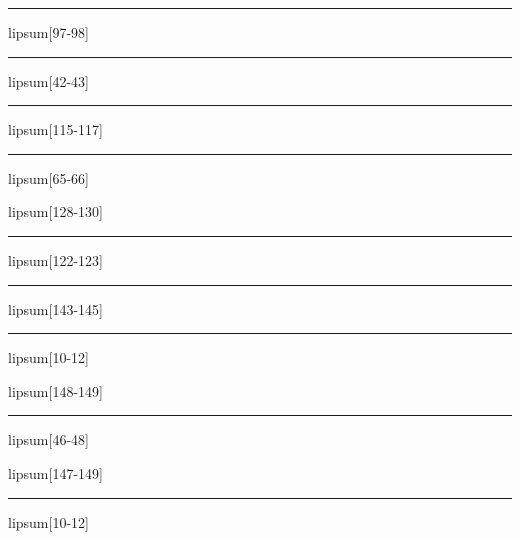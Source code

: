 \documentclass[11pt,a4paper]{article}
\begin{document}
\begin{simplewrap}
  \textcolor{pink!56}{\rule{5.4cm}{6.1cm}}
\end{simplewrap}
lipsum[97-98]

\begin{simplewrap}
  \textcolor{blue!59}{\rule{3.5cm}{4.7cm}}
\end{simplewrap}
lipsum[42-43]

\begin{simplewrap}
  \textcolor{cyan!59}{\rule{5.1cm}{5.4cm}}
\end{simplewrap}
lipsum[115-117]

\begin{simplewrap}
  \textcolor{cyan!17}{\rule{5.7cm}{9.7cm}}
\end{simplewrap}
lipsum[65-66]

lipsum[128-130]

\begin{simplewrap}
  \textcolor{magenta!10}{\rule{4.8cm}{5.9cm}}
\end{simplewrap}
lipsum[122-123]

\begin{simplewrap}
  \textcolor{blue!15}{\rule{4.8cm}{2.1cm}}
\end{simplewrap}
lipsum[143-145]

\begin{simplewrap}
  \textcolor{yellow!13}{\rule{3.6cm}{2.4cm}}
\end{simplewrap}
lipsum[10-12]

lipsum[148-149]

\begin{simplewrap}
  \textcolor{violet!31}{\rule{5.8cm}{2.4cm}}
\end{simplewrap}
lipsum[46-48]

lipsum[147-149]

\begin{simplewrap}
  \textcolor{magenta!21}{\rule{5.9cm}{8.0cm}}
\end{simplewrap}
lipsum[10-12]
\end{document}
